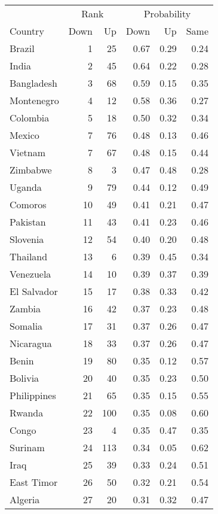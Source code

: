 
\begin{longtable}[t]{lrrrrr}
\toprule
\multicolumn{1}{c}{ } & \multicolumn{2}{c}{Rank} & \multicolumn{3}{c}{Probability} \\
\cmidrule(l{3pt}r{3pt}){2-3} \cmidrule(l{3pt}r{3pt}){4-6}
Country & Down & Up & Down & Up & Same\\
\midrule
Brazil & 1 & 25 & 0.67 & 0.29 & 0.24\\
India & 2 & 45 & 0.64 & 0.22 & 0.28\\
Bangladesh & 3 & 68 & 0.59 & 0.15 & 0.35\\
Montenegro & 4 & 12 & 0.58 & 0.36 & 0.27\\
Colombia & 5 & 18 & 0.50 & 0.32 & 0.34\\
\addlinespace
Mexico & 7 & 76 & 0.48 & 0.13 & 0.46\\
Vietnam & 7 & 67 & 0.48 & 0.15 & 0.44\\
Zimbabwe & 8 & 3 & 0.47 & 0.48 & 0.28\\
Uganda & 9 & 79 & 0.44 & 0.12 & 0.49\\
Comoros & 10 & 49 & 0.41 & 0.21 & 0.47\\
\addlinespace
Pakistan & 11 & 43 & 0.41 & 0.23 & 0.46\\
Slovenia & 12 & 54 & 0.40 & 0.20 & 0.48\\
Thailand & 13 & 6 & 0.39 & 0.45 & 0.34\\
Venezuela & 14 & 10 & 0.39 & 0.37 & 0.39\\
El Salvador & 15 & 17 & 0.38 & 0.33 & 0.42\\
\addlinespace
Zambia & 16 & 42 & 0.37 & 0.23 & 0.48\\
Somalia & 17 & 31 & 0.37 & 0.26 & 0.47\\
Nicaragua & 18 & 33 & 0.37 & 0.26 & 0.47\\
Benin & 19 & 80 & 0.35 & 0.12 & 0.57\\
Bolivia & 20 & 40 & 0.35 & 0.23 & 0.50\\
\addlinespace
Philippines & 21 & 65 & 0.35 & 0.15 & 0.55\\
Rwanda & 22 & 100 & 0.35 & 0.08 & 0.60\\
Congo & 23 & 4 & 0.35 & 0.47 & 0.35\\
Surinam & 24 & 113 & 0.34 & 0.05 & 0.62\\
Iraq & 25 & 39 & 0.33 & 0.24 & 0.51\\
\addlinespace
East Timor & 26 & 50 & 0.32 & 0.21 & 0.54\\
Algeria & 27 & 20 & 0.31 & 0.32 & 0.47\\

\end{longtable}
